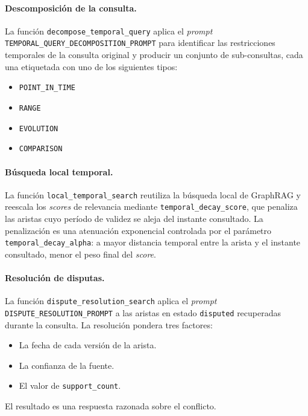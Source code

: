 \paragraph{Descomposición de la consulta.}
La función \texttt{decompose\_temporal\_query} aplica el \emph{prompt} \texttt{TEMPORAL\_QUERY\_DECOMPOSITION\_PROMPT} para identificar las restricciones temporales de la consulta original y producir un conjunto de sub-consultas, cada una etiquetada con uno de los siguientes tipos:

\begin{itemize}
  \item \texttt{POINT\_IN\_TIME}
  \item \texttt{RANGE}
  \item \texttt{EVOLUTION}
  \item \texttt{COMPARISON}
\end{itemize}

\paragraph{Búsqueda local temporal.}
La función \texttt{local\_temporal\_search} reutiliza la búsqueda local de GraphRAG y reescala los \emph{scores} de relevancia mediante \texttt{temporal\_decay\_score}, que penaliza las aristas cuyo período de validez se aleja del instante consultado. La penalización es una atenuación exponencial controlada por el parámetro \texttt{temporal\_decay\_alpha}: a mayor distancia temporal entre la arista y el instante consultado, menor el peso final del \emph{score}.

\paragraph{Resolución de disputas.}
La función \texttt{dispute\_resolution\_search} aplica el \emph{prompt} \texttt{DISPUTE\_RESOLUTION\_PROMPT} a las aristas en estado \texttt{disputed} recuperadas durante la consulta. La resolución pondera tres factores:

\begin{itemize}
  \item La fecha de cada versión de la arista.
  \item La confianza de la fuente.
  \item El valor de \texttt{support\_count}.
\end{itemize}

El resultado es una respuesta razonada sobre el conflicto.


